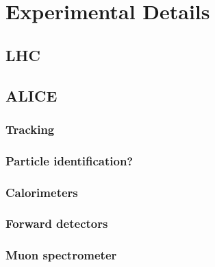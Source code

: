 
\section{Experimental Details}
\label{sec:exp}

\subsection{LHC}
\label{sec:lhc}
\subsection{ALICE}
\label{sec:alice}
\subsubsection{Tracking}
\subsubsection{Particle identification?}
\subsubsection{Calorimeters}
\subsubsection{Forward detectors}
\subsubsection{Muon spectrometer}
